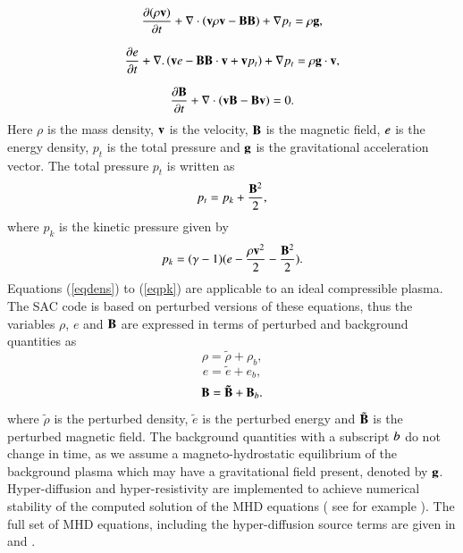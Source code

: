 \documentclass[authoryear,final,1p]{elsarticle}
\begin{document}
\begin{equation}\label{eqmom}
{{\partial ( \rho {\bf v})}\over{\partial t}}+\nabla\cdot\left( {\bf v}\rho {\bf v}-{\bf B B}\right)+\nabla p_t=\rho{\bf g},
\end{equation}

\begin{equation}\label{eqe}
{{\partial e}\over{\partial t}}+\nabla.\left({\bf v}e-{\bf B B}\cdot{\bf v}+{\bf v}p_{t}\right)+\nabla p_t=\rho{\bf g}\cdot{\bf v},
\end{equation}

\begin{equation}\label{eqb}
{{\partial{\bf B}}\over{\partial t}} +\nabla \cdot\left(  {\bf vB}-{\bf Bv}\right)=0.
\end{equation}
Here $\rho$ is the mass density, $ \bf { v} $ is the velocity,   $ \bf B$ is the magnetic field, $\it{e}$ is the energy density, $p_{t}$ is the total pressure and $\bf g$ is the gravitational acceleration vector.
The total pressure $p_{t}$ is written as
\begin{equation}
p_{t}=p_{k}+{{\bf B}^{2}\over{2}},
\label{eqpt}
\end{equation}
where $p_k$ is the kinetic pressure given by
\begin{equation}
p_{k}=(\gamma - 1)( e-{{\rho \bf v }^{2}\over{2}}-  {{\bf B}^{2}\over{2}} ).
\label{eqpk}
\end{equation}
Equations (\ref{eqdens}) to (\ref{eqpk}) are applicable to an ideal compressible plasma. The SAC code is based on perturbed versions of these equations, thus the variables $\rho $, $e$ and  $\bf B$ are expressed in terms of perturbed and background quantities as
\begin{equation}
\rho = \tilde{\rho}+\rho _{b},
\end{equation}
\begin{equation}
e = \tilde{e}+e _{b},
\end{equation}
\begin{equation}
\bf B = \tilde{\bf B}+{\bf B}_{\it{b}}.
\end{equation}
where $\tilde{\rho}$ is the  perturbed density,  $\tilde{e}$ is the perturbed energy and $\tilde{\bf B}$  is the perturbed magnetic field. The background quantities with a subscript $\it{b}$ do not change in time, as we assume a magneto-hydrostatic equilibrium of the background plasma which may have a gravitational field present, denoted by $\bf g$. Hyper-diffusion and hyper-resistivity are implemented to achieve numerical stability of the computed solution of the MHD equations ( see for example \citet{Caunt2001}).  The full set of MHD equations, including the hyper-diffusion source terms are given in \citet{Griffiths2015} and \citet{Shelyag2008}.
\end{document}
